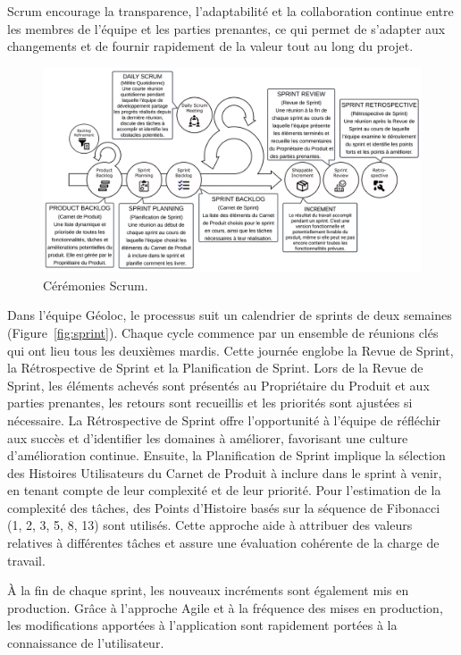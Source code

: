 Scrum encourage la transparence, l'adaptabilité et la collaboration continue entre les membres de l'équipe et les parties prenantes, ce qui permet de s'adapter aux changements et de fournir rapidement de la valeur tout au long du projet.

\begin{figure}[ht]
    \centering
    \includegraphics[width=\textwidth]{img/agile-02}
    \caption{Cérémonies Scrum.}
    \label{fig:agile}
\end{figure}

Dans l'équipe Géoloc, le processus suit un calendrier de sprints de deux semaines (Figure~\ref{fig:sprint}). Chaque cycle commence par un ensemble de réunions clés qui ont lieu tous les deuxièmes mardis. Cette journée englobe la Revue de Sprint, la Rétrospective de Sprint et la Planification de Sprint. Lors de la Revue de Sprint, les éléments achevés sont présentés au Propriétaire du Produit et aux parties prenantes, les retours sont recueillis et les priorités sont ajustées si nécessaire. La Rétrospective de Sprint offre l'opportunité à l'équipe de réfléchir aux succès et d'identifier les domaines à améliorer, favorisant une culture d'amélioration continue. Ensuite, la Planification de Sprint implique la sélection des Histoires Utilisateurs du Carnet de Produit à inclure dans le sprint à venir, en tenant compte de leur complexité et de leur priorité. Pour l'estimation de la complexité des tâches, des Points d'Histoire basés sur la séquence de Fibonacci (1, 2, 3, 5, 8, 13) sont utilisés. Cette approche aide à attribuer des valeurs relatives à différentes tâches et assure une évaluation cohérente de la charge de travail.

À la fin de chaque sprint, les nouveaux incréments sont également mis en production. Grâce à l'approche Agile et à la fréquence des mises en production, les modifications apportées à l'application sont rapidement portées à la connaissance de l'utilisateur.

